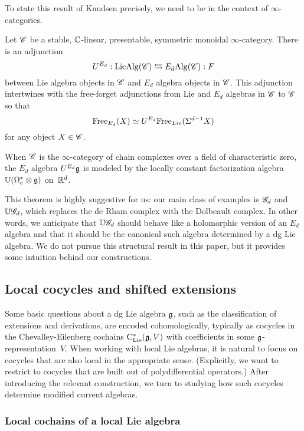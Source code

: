 To state this result of Knudsen precisely, we need to be in the context of $\infty$-categories.

\begin{thm} 
\label{thm:knudsen}
Let $\mathscr C$ be a stable, $\mathbb C$-linear, presentable, symmetric monoidal $\infty$-category.
There is an adjunction
\[
U^{E_d} : {\rm LieAlg}(\mathscr C) \leftrightarrows E_d{\rm Alg} (\mathscr C): F
\]
between Lie algebra objects in $\mathscr C$ and $E_d$ algebra objects in $\mathscr C$.
This adjunction intertwines with the free-forget adjunctions from Lie and $E_d$ algebras in $\mathscr C$ to $\mathscr C$ 
so that 
\[
{\rm Free}_{E_d}(X) \simeq U^{E_d} {\rm Free}_{Lie}(\Sigma^{d-1} X)
\]
for any object $X \in \mathscr C$. 

When $\mathscr C$ is the $\infty$-category of chain complexes over a field of characteristic zero,
the $E_d$ algebra $U^{E_d} \mathfrak g$ is modeled by the locally constant factorization algebra $\mathbb U(\Omega^*_c \otimes \mathfrak g)$ on~$\mathbb R^d$.
\end{thm}

This theorem is highly suggestive for us:
our main class of examples is $\mathscr G_d$ and $\mathbb U \mathscr G_d$,
which replaces the de Rham complex with the Dolbeault complex.
In other words, we anticipate that $\mathbb U \mathscr G_d$ should behave like a holomorphic version of an $E_d$ algebra
and that it should be the canonical such algebra determined by a dg Lie algebra.
We do not pursue this structural result in this paper,
but it provides some intuition behind our constructions.

\subsection{Local cocycles and shifted extensions}
\label{sec: localcocycle}

Some basic questions about a dg Lie algebra $\mathfrak g$, such as the classification of extensions and derivations, are encoded cohomologically, typically as cocycles in the Chevalley-Eilenberg cochains ${\rm C}_{\rm Lie}^*(\mathfrak g,V)$ with coefficients in some $\mathfrak g$-representation~$V$.
When working with local Lie algebras, it is natural to focus on cocycles that are also local in the appropriate sense.
(Explicitly, we want to restrict to cocycles that are built out of polydifferential operators.)
After introducing the relevant construction, we turn to studying how such cocycles determine modified current algebras.

\subsubsection{Local cochains of a local Lie algebra}

